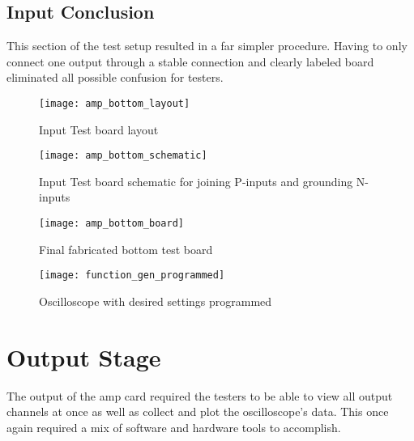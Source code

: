 \subsection{Input Conclusion}
This section of the test setup resulted in a far simpler procedure. Having to only connect one output through a stable connection and clearly labeled board eliminated all possible confusion for testers.
\begin{figure}[!htb]
	\centering
	\texttt{[image: amp\_bottom\_layout]}
	\caption{Input Test board layout}
\end{figure}
\begin{figure}[!htb]
	\centering
	\texttt{[image: amp\_bottom\_schematic]}
	\caption{Input Test board schematic for joining P-inputs and grounding N-inputs}
\end{figure}
\begin{figure}
	\centering
	\texttt{[image: amp\_bottom\_board]}
	\caption{Final fabricated bottom test board}
\end{figure}
\begin{figure}
	\centering
	\texttt{[image: function\_gen\_programmed]}
	\caption{Oscilloscope with desired settings programmed}
\end{figure}

\section{Output Stage}
The output of the amp card required the testers to be able to view all output channels at once as well as collect and plot the oscilloscope's data. This once again required a mix of software and hardware tools to accomplish.
